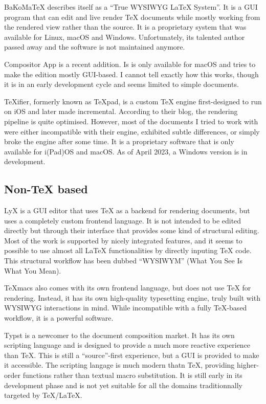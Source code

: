 \documentclass{article}
\begin{document}
BaKoMa\TeX{} describes itself as a ``True WYSIWYG \LaTeX{} System''. It is a GUI program that can edit and live render \TeX{} documents while mostly working from the rendered view rather than the source. It is a proprietary system that was available for Linux, macOS and Windows. Unfortunately, its talented author passed away and the software is not maintained anymore.

Compositor App is a recent addition. Is is only available for macOS and tries to make the edition mostly GUI-based. I cannot tell exactly how this works, though it is in an early development cycle and seems limited to simple documents.

\TeX{}ifier, formerly known as \TeX{}pad, is a custom \TeX{} engine first-designed to run on iOS and later made incremental. According to their blog, the rendering pipeline is quite optimised. However, most of the documents I tried to work with were either incompatible with their engine, exhibited subtle differences, or simply broke the engine after some time. It is a proprietary software that is only available for i(Pad)OS and macOS. As of April 2023, a Windows version is in development.

\subsection{Non-\TeX{} based}

LyX is a GUI editor that uses \TeX{} as a backend for rendering documents, but uses a completely custom frontend language. It is not intended to be edited directly but through their interface that provides some kind of structural editing. Most of the work is supported by nicely integrated features, and it seems to possible to use almost all \LaTeX{} functionalities by directly inputing \TeX{} code. This structural workflow has been dubbed ``WYSIWYM'' (What You See Is What You Mean).

TeXmacs also comes with its own frontend language, but does not use \TeX{} for rendering. Instead, it has its own high-quality typesetting engine, truly built with WYSIWYG interactions in mind. While incompatible with a fully \TeX{}-based workflow, it is a powerful software.

Typst is a newcomer to the document composition market. It has its own scripting language and is designed to provide a much more reactive experience than \TeX{}. This is still a ``source''-first experience, but a GUI is provided to make it accessible. The scripting langage is much modern thatn \TeX{}, providing higher-order functions rather than textual macro substitution. It is still early in its development phase and is not yet suitable for all the domains traditionnally targeted by \TeX/\LaTeX.
\end{document}
